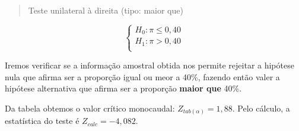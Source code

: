 \documentclass[
]{book}
\begin{document}
\hfill\break

\begin{quote}
Teste unilateral à direita (tipo: maior que)
\end{quote}

\hfill\break

\[
\begin{cases}
    H_{0}: \pi \le 0,40\\
    H_{1}: \pi > 0,40\\
\end{cases}
\]

\hfill\break

Iremos verificar se a informação amostral obtida nos permite rejeitar a hipótese nula que afirma ser a proporção igual ou meor a 40\%, fazendo então valer a hipótese alternativa que afirma ser a proporção \textbf{maior que} 40\%.

\hfill\break

Da tabela obtemos o valor crítico monocaudal: \(Z_{tab\left(\alpha\right)}=1,88\). Pelo cálculo, a estatística do teste é \(Z_{calc}=-4,082\).

\hfill\break
\end{document}
